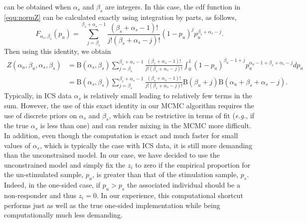 \documentclass{article}
\begin{document}
can be obtained when $\alpha_s$ and $\beta_s$ are integers. In this case, the cdf function in \eqref{equ:normZ} can be calculated exactly using integration by parts, as follows,
\[
F_{\alpha_s,\beta_s}(p_u)=\sum_{j=\beta_s}^{\beta_s+\alpha_s-1} \frac{(\beta_s+\alpha_s-1)!}{j!(\beta_s+\alpha_s-j)!}(1-p_u)^jp_u^{\beta_s+\alpha_s-j}.
\label{eq:IBident}
\]
Then using this identity, we obtain
\begin{align*}
Z(\alpha_u, \beta_u, \alpha_s, \beta_s)&=\mathrm{B}(\alpha_s,\beta_s)\sum_{j=\beta_s}^{\beta_s+\alpha_s-1}\frac{(\beta_s+\alpha_s-1)!}{j!(\beta_s+\alpha_s-j)!}\int_{0}^1(1-p_u)^{\beta_u-1+j}p_u^{\alpha_u-1+\beta_s+\alpha_s-j}dp_u\\
&=\mathrm{B}(\alpha_s,\beta_s)\sum_{j=\beta_s}^{\beta_s+\alpha_s-1}\frac{(\beta_s+\alpha_s-1)!}{j!(\beta_s+\alpha_s-j)!}\mathrm{B}(\beta_u+j)\mathrm{B}(\alpha_u+\beta_s+\alpha_s-j).
\label{equ:normZ}
\end{align*}
Typically, in ICS data $\alpha_s$ is relatively small leading to relatively few terms in the sum. However, the use of this exact identity in our MCMC algorithm requires the use of discrete priors on $\alpha_s$ and $\beta_s$, which can be restrictive in terms of fit (\textit{e.g.},  if the true $\alpha_s$ is less than one) and can render mixing in the MCMC more difficult. In addition, even though the computation is exact and much faster for small values of $\alpha_s$, which is typically the case with ICS data, it is still more demanding than the unconstrained model. In our case, we have decided to use the unconstrained model and simply fix the $z_i$ to zero if the empirical proportion for the un-stimulated sample, $p_u$, is greater than that of the stimulation sample, $p_s$. Indeed, in the one-sided case, if $p_u>p_s$ the associated individual should be a non-responder and thus $z_i=0$. In our experience, this computational shortcut performs just as well as the true one-sided implementation while being computationally much less demanding.  
\end{document}
